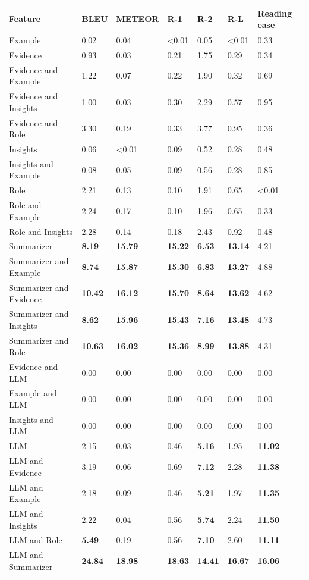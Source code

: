 \begin{tabular}{|l|l|l|l|l|l|l|}
\hline
\textbf{Feature} & BLEU & METEOR & R-1 & R-2 & R-L & Reading ease \\
 \hline
 Example & 0.02 & 0.04 & \textless{}0.01 & 0.05 & \textless{}0.01 & 0.33 \\
 \hline
 Evidence & 0.93 & 0.03 & 0.21 & 1.75 & 0.29 & 0.34 \\
 \hline
 Evidence and Example & 1.22 & 0.07 & 0.22 & 1.90 & 0.32 & 0.69 \\
 \hline
 Evidence and Insights & 1.00 & 0.03 & 0.30 & 2.29 & 0.57 & 0.95 \\
 \hline
 Evidence and Role & 3.30 & 0.19 & 0.33 & 3.77 & 0.95 & 0.36 \\
 \hline
 Insights & 0.06 & \textless{}0.01 & 0.09 & 0.52 & 0.28 & 0.48 \\
 \hline
 Insights and Example & 0.08 & 0.05 & 0.09 & 0.56 & 0.28 & 0.85 \\
 \hline
 Role & 2.21 & 0.13 & 0.10 & 1.91 & 0.65 & \textless{}0.01 \\
 \hline
 Role and Example & 2.24 & 0.17 & 0.10 & 1.96 & 0.65 & 0.33 \\
 \hline
 Role and Insights & 2.28 & 0.14 & 0.18 & 2.43 & 0.92 & 0.48 \\
 \hline
 Summarizer & \textbf{8.19} & \textbf{15.79} & \textbf{15.22} & \textbf{6.53} & \textbf{13.14} & 4.21 \\
 \hline
 Summarizer and Example & \textbf{8.74} & \textbf{15.87} & \textbf{15.30} & \textbf{6.83} & \textbf{13.27} & 4.88 \\
 \hline
 Summarizer and Evidence & \textbf{10.42} & \textbf{16.12} & \textbf{15.70} & \textbf{8.64} & \textbf{13.62} & 4.62 \\
 \hline
 Summarizer and Insights & \textbf{8.62} & \textbf{15.96} & \textbf{15.43} & \textbf{7.16} & \textbf{13.48} & 4.73 \\
 \hline
 Summarizer and Role & \textbf{10.63} & \textbf{16.02} & \textbf{15.36} & \textbf{8.99} & \textbf{13.88} & 4.31 \\
 \hline
 Evidence and LLM & 0.00 & 0.00 & 0.00 & 0.00 & 0.00 & 0.00 \\
 \hline
 Example and LLM & 0.00 & 0.00 & 0.00 & 0.00 & 0.00 & 0.00 \\
 \hline
 Insights and LLM & 0.00 & 0.00 & 0.00 & 0.00 & 0.00 & 0.00 \\
 \hline
 LLM & 2.15 & 0.03 & 0.46 & \textbf{5.16} & 1.95 & \textbf{11.02} \\
 \hline
 LLM and Evidence & 3.19 & 0.06 & 0.69 & \textbf{7.12} & 2.28 & \textbf{11.38} \\
 \hline
 LLM and Example & 2.18 & 0.09 & 0.46 & \textbf{5.21} & 1.97 & \textbf{11.35} \\
 \hline
 LLM and Insights & 2.22 & 0.04 & 0.56 & \textbf{5.74} & 2.24 & \textbf{11.50} \\
 \hline
 LLM and Role & \textbf{5.49} & 0.19 & 0.56 & \textbf{7.10} & 2.60 & \textbf{11.11} \\
 \hline
 LLM and Summarizer & \textbf{24.84} & \textbf{18.98} & \textbf{18.63} & \textbf{14.41} & \textbf{16.67} & \textbf{16.06} \\
\hline
\end{tabular}
